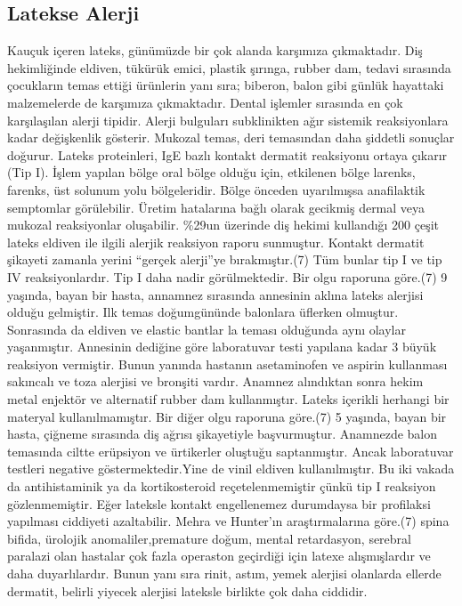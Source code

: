 \subsection{Latekse Alerji}
Kauçuk içeren lateks, günümüzde bir çok alanda karşımıza çıkmaktadır.  Diş hekimliğinde eldiven, tükürük emici, plastik şırınga, rubber dam, tedavi sırasında çocukların temas ettiği ürünlerin yanı sıra; biberon, balon gibi günlük hayattaki malzemelerde de karşımıza çıkmaktadır. Dental işlemler sırasında en çok karşılaşılan alerji tipidir. Alerji bulguları subklinikten ağır sistemik reaksiyonlara kadar değişkenlik gösterir.
Mukozal temas, deri temasından daha şiddetli sonuçlar doğurur.  Lateks proteinleri, IgE bazlı kontakt dermatit reaksiyonu ortaya çıkarır (Tip I).  İşlem yapılan bölge oral bölge olduğu için, etkilenen bölge larenks, farenks, üst solunum yolu bölgeleridir. Bölge önceden uyarılmışsa anafilaktik semptomlar görülebilir. Üretim hatalarına bağlı olarak gecikmiş dermal veya mukozal reaksiyonlar oluşabilir.
\%29un üzerinde diş hekimi kullandığı 200 çeşit lateks eldiven ile ilgili alerjik reaksiyon raporu sunmuştur. Kontakt dermatit şikayeti zamanla yerini “gerçek alerji”ye bırakmıştır.(7) Tüm bunlar tip I ve tip IV reaksiyonlardır. Tip I daha nadir görülmektedir.
Bir olgu raporuna göre.(7)  9 yaşında, bayan bir hasta, annamnez sırasında annesinin aklına lateks alerjisi olduğu gelmiştir.  Ilk temas doğumgününde balonlara üflerken olmuştur.  Sonrasında da eldiven ve elastic bantlar la teması olduğunda aynı olaylar yaşanmıştır. Annesinin dediğine göre laboratuvar testi yapılana kadar 3 büyük reaksiyon vermiştir. Bunun yanında hastanın asetaminofen ve aspirin kullanması sakıncalı ve toza alerjisi ve bronşiti vardır. Anamnez alındıktan sonra hekim metal enjektör ve alternatif rubber dam kullanmıştır. Lateks içerikli herhangi bir materyal kullanılmamıştır.
Bir diğer olgu raporuna göre.(7) 5 yaşında, bayan bir hasta, çiğneme sırasında diş ağrısı şikayetiyle başvurmuştur. Anamnezde balon temasında ciltte erüpsiyon ve ürtikerler oluştuğu saptanmıştır. Ancak laboratuvar testleri negative göstermektedir.Yine de vinil eldiven kullanılmıştır.
Bu iki vakada da antihistaminik ya da kortikosteroid reçetelenmemiştir çünkü tip I reaksiyon gözlenmemiştir. Eğer lateksle kontakt engellenemez durumdaysa bir profilaksi yapılması ciddiyeti azaltabilir.
Mehra ve Hunter’ın araştırmalarına göre.(7) spina bifida, ürolojik anomaliler,premature doğum, mental retardasyon, serebral paralazi olan hastalar çok fazla operaston geçirdiği için latexe alışmışlardır ve daha duyarlılardır. Bunun yanı sıra rinit, astım, yemek alerjisi olanlarda ellerde dermatit, belirli yiyecek alerjisi  lateksle birlikte çok daha ciddidir.
